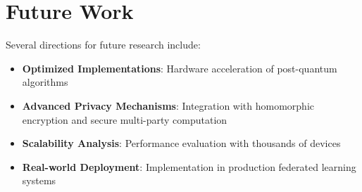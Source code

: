 \documentclass[journal]{IEEEtran}
\begin{document}
\section{Future Work}

Several directions for future research include:

\begin{itemize}
\item \textbf{Optimized Implementations}: Hardware acceleration of post-quantum algorithms
\item \textbf{Advanced Privacy Mechanisms}: Integration with homomorphic encryption and secure multi-party computation
\item \textbf{Scalability Analysis}: Performance evaluation with thousands of devices
\item \textbf{Real-world Deployment}: Implementation in production federated learning systems
\end{itemize}








\end{document}

